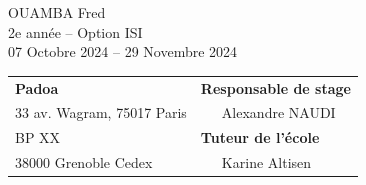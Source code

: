 \begin{center}
OUAMBA Fred\\
2e année -- Option ISI\\
\vspace{3mm}
07 Octobre 2024 -- 29 Novembre 2024\\
\vspace{4cm}
\begin{tabular}{p{10cm}p{10cm}}
{\bf Padoa}                                            &{\bf Responsable de stage}\\
{\footnotesize 33 av. Wagram, 75017 Paris}       & ~~~Alexandre NAUDI\\
{\footnotesize BP XX}                                        & {\bf Tuteur de l'école}\\
{\footnotesize 38000 Grenoble Cedex}                          & ~~~Karine Altisen\\
\end{tabular}
\end{center}



